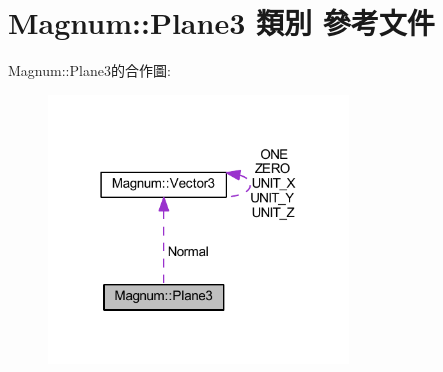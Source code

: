 \hypertarget{class_magnum_1_1_plane3}{}\section{Magnum\+:\+:Plane3 類別 參考文件}
\label{class_magnum_1_1_plane3}


Magnum\+:\+:Plane3的合作圖\+:\nopagebreak
\begin{figure}[H]
\begin{center}
\leavevmode
\includegraphics[width=226pt]{class_magnum_1_1_plane3__coll__graph}
\end{center}
\end{figure}
